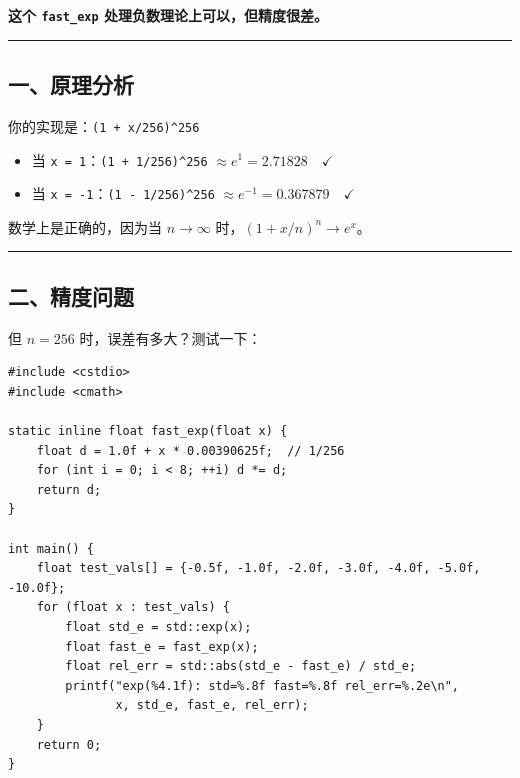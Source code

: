 \documentclass[11pt, a4paper]{article}
\begin{document}
\begin{aibox}
\textbf{这个 \texttt{fast\_exp} 处理负数理论上可以，但精度很差。}

\begin{center}\rule{\textwidth}{0.4pt}\end{center}

\subsection*{一、原理分析}

你的实现是：\texttt{(1 + x/256)\textasciicircum 256}

\begin{itemize}
    \item 当 \texttt{x = 1}：\texttt{(1 + 1/256)\textasciicircum 256} $\approx e^1 = 2.71828 \quad \checkmark$
    \item 当 \texttt{x = -1}：\texttt{(1 - 1/256)\textasciicircum 256} $\approx e^{-1} = 0.367879 \quad \checkmark$
\end{itemize}

数学上是正确的，因为当 $n \to \infty$ 时，$(1 + x/n)^n \to e^x$。

\begin{center}\rule{\textwidth}{0.4pt}\end{center}

\subsection*{二、精度问题}

但 $n=256$ 时，误差有多大？测试一下：

\begin{tcolorbox}[colback=white,colframe=gray!50!white,boxrule=0.5pt,arc=2pt,left=5pt,right=5pt,top=5pt,bottom=5pt]
\begin{verbatim}
#include <cstdio>
#include <cmath>

static inline float fast_exp(float x) {
    float d = 1.0f + x * 0.00390625f;  // 1/256
    for (int i = 0; i < 8; ++i) d *= d;
    return d;
}

int main() {
    float test_vals[] = {-0.5f, -1.0f, -2.0f, -3.0f, -4.0f, -5.0f, -10.0f};
    for (float x : test_vals) {
        float std_e = std::exp(x);
        float fast_e = fast_exp(x);
        float rel_err = std::abs(std_e - fast_e) / std_e;
        printf("exp(%4.1f): std=%.8f fast=%.8f rel_err=%.2e\n", 
               x, std_e, fast_e, rel_err);
    }
    return 0;
}
\end{verbatim}
\end{tcolorbox}


\end{aibox}
\end{document}
